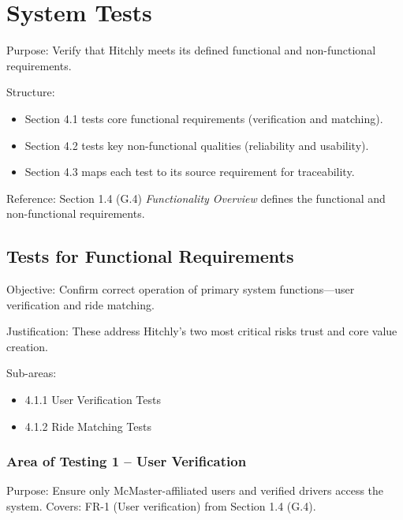 \documentclass[12pt, titlepage]{article}
\begin{document}
\section{System Tests}

Purpose: Verify that Hitchly meets its defined functional and non-functional requirements.

Structure: 
\begin{itemize}
    \item Section 4.1 tests core functional requirements (verification and matching).
    \item Section 4.2 tests key non-functional qualities (reliability and usability).
    \item Section 4.3 maps each test to its source requirement for traceability.
\end{itemize}

Reference: Section 1.4 (G.4) \textit{Functionality Overview} defines the functional and non-functional requirements.

\subsection{Tests for Functional Requirements}

Objective: Confirm correct operation of primary system functions—user verification and ride matching.

Justification: These address Hitchly’s two most critical risks trust and core value creation.

Sub-areas:
\begin{itemize}
    \item 4.1.1 User Verification Tests
    \item 4.1.2 Ride Matching Tests
\end{itemize}

\subsubsection{Area of Testing 1 – User Verification}

Purpose: Ensure only McMaster-affiliated users and verified drivers access the system.  
Covers: FR-1 (User verification) from Section 1.4 (G.4).
\end{document}
